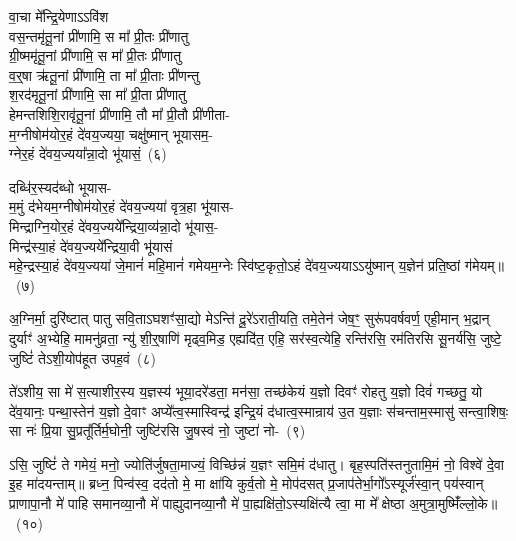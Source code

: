 वा॒चा मे᳚न्द्रि॒येणा\-ऽऽ\-वि॑श\\
वस॒न्तमृ॑तू॒नां प्री॑णामि॒ स मा᳚ प्री॒तः प्री॑णातु\\
ग्री॒ष्ममृ॑तू॒नां प्री॑णामि॒ स मा᳚ प्री॒तः प्री॑णातु\\
व॒र्॒\mbox{}षा ऋ॑तू॒नां प्री॑णामि॒ ता मा᳚ प्री॒ताः प्री॑णन्तु\\
श॒रद॑मृतू॒नां प्री॑णामि॒ सा मा᳚ प्री॒ता प्री॑णातु\\
हेमन्तशिशि॒रावृ॑तू॒नां प्री॑णामि॒ तौ मा᳚ प्री॒तौ प्री॑णीता-\\
म॒ग्नी\-षोम॑योर॒हं दे॑वय॒ज्यया॒ चक्षु॑ष्मान् भूयासम॒-\\
ग्नेर॒हं दे॑वय॒ज्यया᳚न्ना॒दो भू॑यासं॒~(६)\ip

दब्धि॑र॒स्यद॑ब्धो भूयास-\\
म॒मुं द॑भेयम॒ग्नी\-षोम॑योर॒हं दे॑वय॒ज्यया॑ वृत्र॒हा भू॑यास-\\
मिन्द्राग्नि॒योर॒हं दे॑वय॒ज्यये᳚न्द्रिया॒\-व्य॑न्ना॒दो भू॑यास॒-\\
मिन्द्र॑स्या॒हं दे॑वय॒ज्यये᳚न्द्रिया॒वी भू॑यासं\\
महे॒न्द्रस्या॒हं दे॑वय॒ज्यया॑ जे॒मानं॑ महि॒मानं॑ गमेयम॒ग्नेः स्वि॑ष्ट॒कृतो॒\-ऽहं दे॑वय॒ज्यया\-ऽऽ\-यु॑ष्मान् य॒ज्ञेन॑ प्रति॒ष्ठां ग॑मेयम्॥~(७)\ip

{\anuvakamend[{रिष्या᳚थ्सपत्न॒क्षय॑ण्यन्ना॒दो भू॑यास॒ꣳ॒ षट्त्रिꣳ॑शच्च}]}

अ॒ग्निर्मा॒ दुरि॑ष्टात् पातु सवि॒ता\-ऽघशꣳ॑सा॒द्यो मे\-ऽन्ति॑ दू॒रे॑\-ऽराती॒यति॒ तमे॒तेन॑ जेष॒ꣳ॒ सुरू॑पवर्\mbox{}षवर्ण॒ एही॒मान् भ॒द्रान् दुर्याꣳ॑ अ॒भ्येहि॒ मामनु॑व्रता॒ न्यु॑ शी॒र्॒\mbox{}षाणि॑ मृढ्व॒मिड॒ एह्यदि॑त॒ एहि॒ सर॑स्व॒त्येहि॒ रन्ति॑रसि॒ रम॑तिरसि सू॒नर्य॑सि॒ जुष्टे॒ जुष्टिं॑ ते\-ऽशी॒योप॑हूत उपह॒वं~(८)\ip

ते॑\-ऽशीय॒ सा मे॑ स॒त्याशीर॒स्य य॒ज्ञस्य॑ भूया॒दरे॑डता॒ मन॑सा॒ तच्छ॑केयं य॒ज्ञो दिवꣳ॑ रोहतु य॒ज्ञो दिवं॑ गच्छतु॒ यो दे॑व॒यानः॒ पन्था॒स्तेन॑ य॒ज्ञो दे॒वाꣳ अप्ये᳚त्व॒स्मास्विन्द्र॑ इन्द्रि॒यं द॑धात्व॒स्मान्राय॑ उ॒त य॒ज्ञाः स॑चन्ताम॒स्मासु॑ सन्त्वा॒शिषः॒ सा नः॑ प्रि॒या सु॒प्रतू᳚र्तिर्म॒घोनी॒ जुष्टि॑रसि जु॒षस्व॑ नो॒ जुष्टा॑ नो-~(९)\ip

ऽसि॒ जुष्टिं॑ ते गमेयं॒ मनो॒ ज्योति॑र्जुषता॒माज्यं॒ विच्छि॑न्नं य॒ज्ञꣳ समि॒मं द॑धातु। बृह॒स्पति॑स्तनुतामि॒मं नो॒ विश्वे॑ दे॒वा इ॒ह मा॑दयन्ताम्॥ ब्रध्न॒ पिन्व॑स्व॒ दद॑तो मे॒ मा क्षा॑यि कुर्व॒तो मे॒ मोप॑दसत् प्र॒जा\-प॑तेर्भा॒गो᳚\-ऽस्यूर्ज॑स्वा॒न् पय॑स्वान् प्राणापा॒नौ मे॑ पाहि समानव्या॒नौ मे॑ पाह्युदानव्या॒नौ मे॑ पा॒ह्यक्षि॑तो॒\-ऽस्यक्षि॑त्यै त्वा॒ मा मे᳚ क्षेष्ठा अ॒मुत्रा॒मुष्मिँ॑ल्लो॒के॥~(१०)\ip

